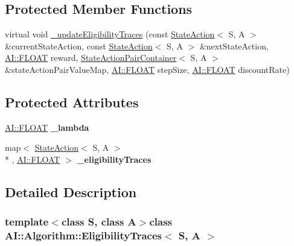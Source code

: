 \subsection*{Protected Member Functions}
\begin{DoxyCompactItemize}
\item 
virtual void \hyperlink{classAI_1_1Algorithm_1_1EligibilityTraces_a354115a368dc58abcdbc9285ec2537df}{\+\_\+update\+Eligibility\+Traces} (const \hyperlink{classAI_1_1StateAction}{State\+Action}$<$ S, A $>$ \&current\+State\+Action, const \hyperlink{classAI_1_1StateAction}{State\+Action}$<$ S, A $>$ \&next\+State\+Action, \hyperlink{namespaceAI_a41b74884a20833db653dded3918e05c3}{A\+I\+::\+F\+L\+O\+A\+T} reward, \hyperlink{classAI_1_1StateActionPairContainer}{State\+Action\+Pair\+Container}$<$ S, A $>$ \&state\+Action\+Pair\+Value\+Map, \hyperlink{namespaceAI_a41b74884a20833db653dded3918e05c3}{A\+I\+::\+F\+L\+O\+A\+T} step\+Size, \hyperlink{namespaceAI_a41b74884a20833db653dded3918e05c3}{A\+I\+::\+F\+L\+O\+A\+T} discount\+Rate)
\end{DoxyCompactItemize}
\subsection*{Protected Attributes}
\begin{DoxyCompactItemize}
\item 
\hypertarget{classAI_1_1Algorithm_1_1EligibilityTraces_a5c7e8c5c912cd0402cd4d60fb7c34da3}{\hyperlink{namespaceAI_a41b74884a20833db653dded3918e05c3}{A\+I\+::\+F\+L\+O\+A\+T} {\bfseries \+\_\+lambda}}\label{classAI_1_1Algorithm_1_1EligibilityTraces_a5c7e8c5c912cd0402cd4d60fb7c34da3}

\item 
\hypertarget{classAI_1_1Algorithm_1_1EligibilityTraces_aa4a94928533e63cb6b263f7abfde4e53}{map$<$ \hyperlink{classAI_1_1StateAction}{State\+Action}$<$ S, A $>$\\*
, \hyperlink{namespaceAI_a41b74884a20833db653dded3918e05c3}{A\+I\+::\+F\+L\+O\+A\+T} $>$ {\bfseries \+\_\+eligibility\+Traces}}\label{classAI_1_1Algorithm_1_1EligibilityTraces_aa4a94928533e63cb6b263f7abfde4e53}

\end{DoxyCompactItemize}


\subsection{Detailed Description}
\subsubsection*{template$<$class S, class A$>$class A\+I\+::\+Algorithm\+::\+Eligibility\+Traces$<$ S, A $>$}

